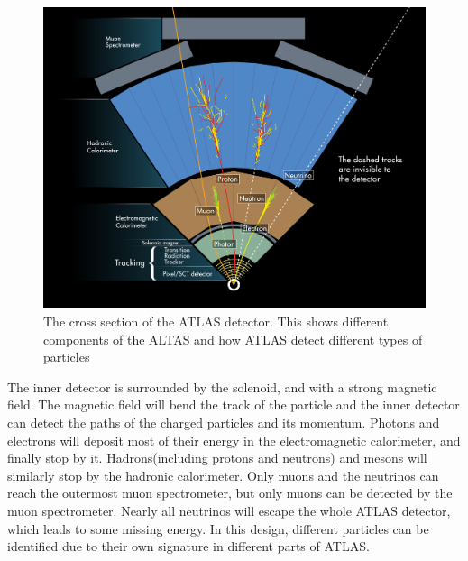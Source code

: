 \begin{figure}
\centering
\includegraphics[width=\textwidth]{data/photo/detector/ATLAS_particles.jpg}
\caption{The cross section of the ATLAS detector. This shows different components of the ALTAS and how ATLAS detect different types of particles \cite{ATLAS_particles}}
\label{fig:ATLAS_particles}
\end{figure}
The inner detector is surrounded by the solenoid, and with a strong magnetic field.
The magnetic field will bend the track of the particle and the inner detector can detect the paths of the charged particles and its momentum.
Photons and electrons will deposit most of their energy in the electromagnetic calorimeter, and finally stop by it.
Hadrons(including protons and neutrons) and mesons will similarly stop by the hadronic calorimeter.
Only muons and the neutrinos can reach the outermost muon spectrometer, but only muons can be detected by the muon spectrometer.
Nearly all neutrinos will escape the whole ATLAS detector, which leads to some missing energy.
In this design, different particles can be identified due to their own signature in different parts of ATLAS.

